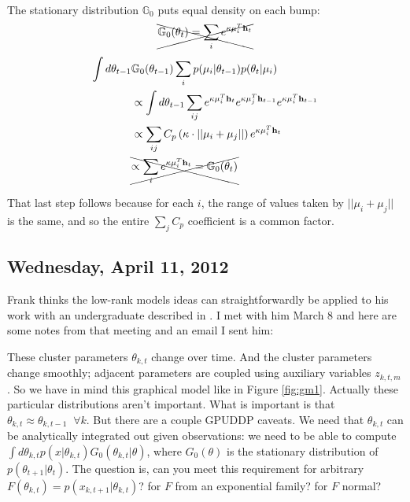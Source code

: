 \documentclass[11pt]{article}
\newcommand{\paperlink}[1]{\href{/Users/adkein/Documents/papers/#1.pdf}{\cite{#1}}}
\newcommand{\mb}{\mathbb}
\begin{document}
The stationary distribution $\mb{G}_0$ puts equal density on each bump:
%
\begin{align*}
\xcancel{\mb{G}_0(\theta_t) = \sum_i e^{\kappa \mu_i^T \mathbf{h}_t}}
\end{align*}
%
\begin{align}
\int d\theta_{t-1} &\mb{G}_0(\theta_{t-1}) \sum_i p(\mu_i|\theta_{t-1})p(\theta_t|\mu_i) \notag \\
&\propto \int d\theta_{t-1} \sum_{ij} e^{\kappa \mu_i^T \mathbf{h}_t} e^{\kappa \mu_j^T\mathbf{h}_{t-1}} e^{\kappa \mu_i^T\mathbf{h}_{t-1}} \notag \\
&\propto \sum_{ij} C_p\left(\kappa\cdot||\mu_i+\mu_j||\right) e^{\kappa \mu_i^T \mathbf{h}_t} \notag \\
&\xcancel{\propto \sum_{i} e^{\kappa \mu_i^T \mathbf{h}_t} = \mb{G}_0(\theta_t)}
\label{eq:stationary_distribution}
\end{align}

\noindent That last step follows because for each $i$, the range of values taken by $||\mu_i+\mu_j||$ is the same, and so the entire $\sum_j C_p$ coefficient is a common factor.

\subsection*{Wednesday, April 11, 2012}
Frank thinks the low-rank models ideas can straightforwardly be applied to his work with an undergraduate described in \paperlink{Neiswanger_2012}. I met with him March 8 and here are some notes from that meeting and an email I sent him:

These cluster parameters $\theta_{k,t}$ change over time. And the cluster parameters change smoothly; adjacent parameters are coupled using auxiliary variables $z_{k,t,m}$. So we have in mind this graphical model like in Figure \ref{fig:gm1}. Actually these particular distributions aren't important. What is important is that $\theta_{k,t}\approx \theta_{k,t-1}\;\;\forall k$. But there are a couple GPUDDP caveats. We need that $\theta_{k,t}$ can be analytically integrated out given observations: we need to be able to compute $\int d\theta_{k,t} p(x|\theta_{k,t}) G_0(\theta_{k,t}|\theta)$, where $G_0(\theta)$ is the stationary distribution of $p(\theta_{t+1}|\theta_t)$. The question is, can you meet this requirement for arbitrary $F(\theta_{k,t})=p(x_{k,t+1}|\theta_{k,t})$? for $F$ from an exponential family? for $F$ normal?
\end{document}
